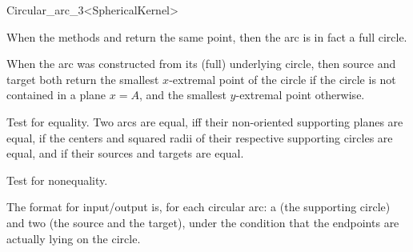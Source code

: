 \begin{ccRefClass}{Circular_arc_3<SphericalKernel>}
\ccGlue
{}

\ccGlue
{}

\ccGlue
{}

When the methods  and  return the same point, then 
the arc is in fact a full circle. %

When the arc was constructed from its (full) underlying circle, then
source and target both return the smallest $x$-extremal point of the
circle if the circle is not contained in a plane $x=A$, and the smallest
$y$-extremal point otherwise.

\ccOperations

{Test for equality. Two arcs are equal, iff their non-oriented
  supporting planes are equal, if the centers and squared
  radii of their respective supporting circles are equal, and if their
  sources and targets are equal.} 

{Test for nonequality.} 


\ccGlue
{}

The format for input/output is, for each circular arc: a  
(the supporting circle) and two  
(the source and the target), under the condition that the endpoints 
are actually lying on the circle. 

\ccSeeAlso

\\

\end{ccRefClass}
